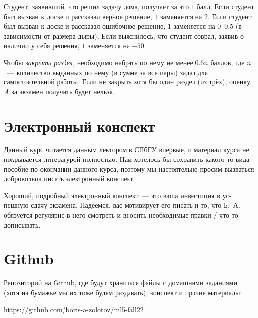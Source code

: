 \documentclass[a4paper,12pt]{article}
\begin{document}
	Студент, заявивший, что решил задачу дома, получает за это \(1\) балл. Если студент был вызван к доске и рассказал верное решение, \(1\) заменяется на \(2\). Если студент был вызван к доске и рассказал ошибочное решение, \(1\) заменяется на \(0\)–\(0.5\) (в зависимости от размера дыры). Если выяснилось, что студент соврал, заявив о наличии у себя решения, \(1\) заменяется на \(-50\).

	Чтобы {\it закрыть раздел,} необходимо набрать по нему не менее \(0.6 n\) баллов, где \(n\)~— количество выданных по нему (в сумме за все пары) задач для самостоятельной работы. Если не закрыть хотя бы один раздел (из трёх), оценку \(A\) за экзамен получить будет нельзя.

\section{Электронный конспект}

	Данный курс читается данным лектором в СПбГУ впервые, и материал курса не покрывается литературой полностью. Нам хотелось бы сохранить какого-то вида пособие по окончании данного курса, поэтому мы настоятельно просим вызваться добровольца писать электронный конспект.

	Хороший, подробный электронный конспект~— это ваша инвестиция в ус-\linebreak пешную сдачу экзамена. Надеемся, вас мотивирует его писать и то, что Б.~А. обязуется регулярно в него смотреть и вносить необходимые правки / что-то дописывать.\hspace{4cm} \textcolor{white}{\cite{shen2,shen3,katlend,lavrmaks,shenfield}}

\section{Github}

	Репозиторий на Github, где будут храниться файлы с домашними заданиями (хотя на бумажке мы их тоже будем раздавать), конспект и прочие материалы:

  \begin{center}
	\url{https://github.com/boris-a-zolotov/ml5-fall22}
  \end{center}



\end{document}
